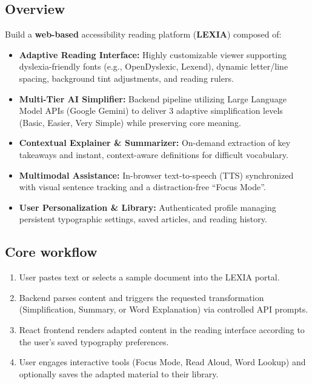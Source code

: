 \documentclass[11pt,a4paper]{article}
\begin{document}
\subsection{Overview}
Build a \textbf{web-based} accessibility reading platform (\textbf{LEXIA}) composed of:
\begin{itemize}[leftmargin=0.7cm]
    \item \textbf{Adaptive Reading Interface:} Highly customizable viewer supporting dyslexia-friendly fonts (e.g., OpenDyslexic, Lexend), dynamic letter/line spacing, background tint adjustments, and reading rulers.
    \item \textbf{Multi-Tier AI Simplifier:} Backend pipeline utilizing Large Language Model APIs (Google Gemini) to deliver 3 adaptive simplification levels (Basic, Easier, Very Simple) while preserving core meaning.
    \item \textbf{Contextual Explainer \& Summarizer:} On-demand extraction of key takeaways and instant, context-aware definitions for difficult vocabulary.
    \item \textbf{Multimodal Assistance:} In-browser text-to-speech (TTS) synchronized with visual sentence tracking and a distraction-free ``Focus Mode''.
    \item \textbf{User Personalization \& Library:} Authenticated profile managing persistent typographic settings, saved articles, and reading history.
\end{itemize}

\subsection{Core workflow}
\begin{enumerate}[leftmargin=0.7cm]
    \item User pastes text or selects a sample document into the LEXIA portal.
    \item Backend parses content and triggers the requested transformation (Simplification, Summary, or Word Explanation) via controlled API prompts.
    \item React frontend renders adapted content in the reading interface according to the user's saved typography preferences.
    \item User engages interactive tools (Focus Mode, Read Aloud, Word Lookup) and optionally saves the adapted material to their library.
\end{enumerate}
\end{document}
